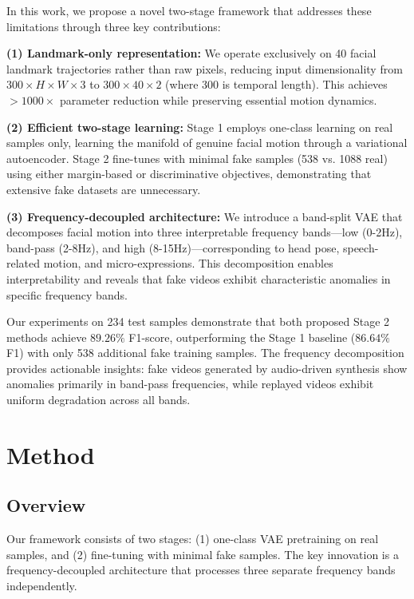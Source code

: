 \documentclass[11pt,twocolumn]{article}
\begin{document}
In this work, we propose a novel two-stage framework that addresses these limitations through three key contributions:

\textbf{(1) Landmark-only representation:} We operate exclusively on 40 facial landmark trajectories rather than raw pixels, reducing input dimensionality from $300 \times H \times W \times 3$ to $300 \times 40 \times 2$ (where 300 is temporal length). This achieves $>1000\times$ parameter reduction while preserving essential motion dynamics.

\textbf{(2) Efficient two-stage learning:} Stage 1 employs one-class learning on real samples only, learning the manifold of genuine facial motion through a variational autoencoder. Stage 2 fine-tunes with minimal fake samples (538 vs. 1088 real) using either margin-based or discriminative objectives, demonstrating that extensive fake datasets are unnecessary.

\textbf{(3) Frequency-decoupled architecture:} We introduce a band-split VAE that decomposes facial motion into three interpretable frequency bands—low (0-2Hz), band-pass (2-8Hz), and high (8-15Hz)—corresponding to head pose, speech-related motion, and micro-expressions. This decomposition enables interpretability and reveals that fake videos exhibit characteristic anomalies in specific frequency bands.

Our experiments on 234 test samples demonstrate that both proposed Stage 2 methods achieve $89.26\%$ F1-score, outperforming the Stage 1 baseline ($86.64\%$ F1) with only 538 additional fake training samples. The frequency decomposition provides actionable insights: fake videos generated by audio-driven synthesis show anomalies primarily in band-pass frequencies, while replayed videos exhibit uniform degradation across all bands.

\section{Method}
\label{sec:method}

\subsection{Overview}

Our framework consists of two stages: (1) one-class VAE pretraining on real samples, and (2) fine-tuning with minimal fake samples. The key innovation is a frequency-decoupled architecture that processes three separate frequency bands independently.
\end{document}

